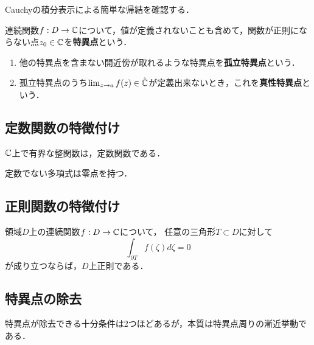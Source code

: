 \documentclass[uplatex, dvipdfmx]{jsreport}
\begin{document}
\begin{tcolorbox}[colframe=ForestGreen, colback=ForestGreen!10!white,breakable,colbacktitle=ForestGreen!40!white,coltitle=black,fonttitle=\bfseries\sffamily,
title=]
    Cauchyの積分表示による簡単な帰結を確認する．
\end{tcolorbox}

\begin{definition}
    連続関数$f:D\to\mathbb{C}$について，値が定義されないことも含めて，関数が正則にならない点$z_0\in\mathbb{C}$を\textbf{特異点}という．
    \begin{enumerate}
        \item 他の特異点を含まない開近傍が取れるような特異点を\textbf{孤立特異点}という．
        \item 孤立特異点のうち$\lim_{z\to a}f(z)\in\hat{\mathbb{C}}$が定義出来ないとき，これを\textbf{真性特異点}という．
    \end{enumerate}
\end{definition}

\subsection{定数関数の特徴付け}

\begin{corollary}[Liouville]
    $\mathbb{C}$上で有界な整関数は，定数関数である．
\end{corollary}

\begin{corollary}[代数学の基本定理]
    定数でない多項式は零点を持つ．
\end{corollary}

\subsection{正則関数の特徴付け}

\begin{corollary}[Morera]
    領域$D$上の連続関数$f:D\to\mathbb{C}$について，
    任意の三角形$T\subset D$に対して
    \[\int_{\partial T}f(\zeta)d\zeta=0\]
    が成り立つならば，$D$上正則である．
\end{corollary}

\subsection{特異点の除去}

\begin{tcolorbox}[colframe=ForestGreen, colback=ForestGreen!10!white,breakable,colbacktitle=ForestGreen!40!white,coltitle=black,fonttitle=\bfseries\sffamily,
title=]
    特異点が除去できる十分条件は2つほどあるが，本質は特異点周りの漸近挙動である．
\end{tcolorbox}
\end{document}
